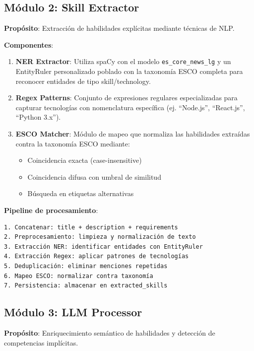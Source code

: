 \subsection{Módulo 2: Skill Extractor}

\textbf{Propósito}: Extracción de habilidades explícitas mediante técnicas de NLP.

\textbf{Componentes}:

\begin{enumerate}
    \item \textbf{NER Extractor}: Utiliza spaCy con el modelo \texttt{es\_core\_news\_lg} y un EntityRuler personalizado poblado con la taxonomía ESCO completa para reconocer entidades de tipo skill/technology.

    \item \textbf{Regex Patterns}: Conjunto de expresiones regulares especializadas para capturar tecnologías con nomenclatura específica (ej. ``Node.js'', ``React.js'', ``Python 3.x'').

    \item \textbf{ESCO Matcher}: Módulo de mapeo que normaliza las habilidades extraídas contra la taxonomía ESCO mediante:
    \begin{itemize}
        \item Coincidencia exacta (case-insensitive)
        \item Coincidencia difusa con umbral de similitud
        \item Búsqueda en etiquetas alternativas
    \end{itemize}
\end{enumerate}

\textbf{Pipeline de procesamiento}:
\begin{verbatim}
1. Concatenar: title + description + requirements
2. Preprocesamiento: limpieza y normalización de texto
3. Extracción NER: identificar entidades con EntityRuler
4. Extracción Regex: aplicar patrones de tecnologías
5. Deduplicación: eliminar menciones repetidas
6. Mapeo ESCO: normalizar contra taxonomía
7. Persistencia: almacenar en extracted_skills
\end{verbatim}

\subsection{Módulo 3: LLM Processor}

\textbf{Propósito}: Enriquecimiento semántico de habilidades y detección de competencias implícitas.

